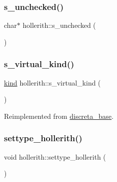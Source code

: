 \mbox{\label{classhollerith_a4b549f6a27d3d9d1c3d9b4eba91b5895}} 
\subsubsection{\texorpdfstring{s\+\_\+unchecked()}{s\_unchecked()}}
{\footnotesize\ttfamily char$\ast$ hollerith\+::s\+\_\+unchecked (\begin{DoxyParamCaption}{ }\end{DoxyParamCaption})\hspace{0.3cm}{\ttfamily [inline]}}

\mbox{\label{classhollerith_a868bba1481a52276f83e18e3b4280b31}} 
\subsubsection{\texorpdfstring{s\+\_\+virtual\+\_\+kind()}{s\_virtual\_kind()}}
{\footnotesize\ttfamily \mbox{\hyperlink{discreta_8h_aaf25ee7e2306d78c74ec7bc48f092e81}{kind}} hollerith\+::s\+\_\+virtual\+\_\+kind (\begin{DoxyParamCaption}{ }\end{DoxyParamCaption})\hspace{0.3cm}{\ttfamily [virtual]}}



Reimplemented from \mbox{\hyperlink{classdiscreta__base_a52778a6d6943a468be083d0785d418fb}{discreta\+\_\+base}}.

\mbox{\label{classhollerith_a23bbd4acfc88a0e90f1245f243f51f76}} 
\subsubsection{\texorpdfstring{settype\+\_\+hollerith()}{settype\_hollerith()}}
{\footnotesize\ttfamily void hollerith\+::settype\+\_\+hollerith (\begin{DoxyParamCaption}{ }\end{DoxyParamCaption})}

